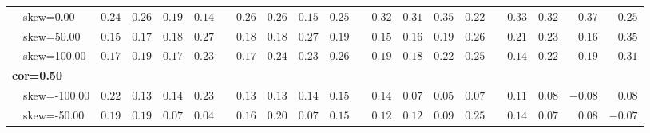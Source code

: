 \begin{table}[!tbp]
\begin{center}
\begin{tabular}{lrrrrcrrrrcrrrrcrrrr}
   ~~skew=0.00&\cellcolor[gray]{0.47}   $0.24$&\cellcolor[gray]{0.47}   $0.26$&\cellcolor[gray]{0.73}   $0.19$&\cellcolor[gray]{0.73}   $0.14$&   &\cellcolor[gray]{0.47}   $0.26$&\cellcolor[gray]{0.47}   $0.26$&\cellcolor[gray]{0.73}   $0.15$&\cellcolor[gray]{0.47}   $0.25$&   &\cellcolor[gray]{0.2}   $0.32$&\cellcolor[gray]{0.47}   $0.31$&\cellcolor[gray]{0.2}   $ 0.35$&\cellcolor[gray]{0.47}   $ 0.22$&   &\cellcolor[gray]{0.2}   $0.33$&\cellcolor[gray]{0.2}   $0.32$&\cellcolor[gray]{0.2}   $ 0.37$&\cellcolor[gray]{0.47}   $ 0.25$\tabularnewline
   ~~skew=50.00&\cellcolor[gray]{0.73}   $0.15$&\cellcolor[gray]{0.73}   $0.17$&\cellcolor[gray]{0.73}   $0.18$&\cellcolor[gray]{0.47}   $0.27$&   &\cellcolor[gray]{0.73}   $0.18$&\cellcolor[gray]{0.73}   $0.18$&\cellcolor[gray]{0.47}   $0.27$&\cellcolor[gray]{0.73}   $0.19$&   &\cellcolor[gray]{0.73}   $0.15$&\cellcolor[gray]{0.73}   $0.16$&\cellcolor[gray]{0.73}   $ 0.19$&\cellcolor[gray]{0.47}   $ 0.26$&   &\cellcolor[gray]{0.47}   $0.21$&\cellcolor[gray]{0.47}   $0.23$&\cellcolor[gray]{0.73}   $ 0.16$&\cellcolor[gray]{0.2}   $ 0.35$\tabularnewline
   ~~skew=100.00&\cellcolor[gray]{0.73}   $0.17$&\cellcolor[gray]{0.73}   $0.19$&\cellcolor[gray]{0.73}   $0.17$&\cellcolor[gray]{0.47}   $0.23$&   &\cellcolor[gray]{0.73}   $0.17$&\cellcolor[gray]{0.47}   $0.24$&\cellcolor[gray]{0.47}   $0.23$&\cellcolor[gray]{0.47}   $0.26$&   &\cellcolor[gray]{0.73}   $0.19$&\cellcolor[gray]{0.73}   $0.18$&\cellcolor[gray]{0.47}   $ 0.22$&\cellcolor[gray]{0.47}   $ 0.25$&   &\cellcolor[gray]{0.73}   $0.14$&\cellcolor[gray]{0.47}   $0.22$&\cellcolor[gray]{0.73}   $ 0.19$&\cellcolor[gray]{0.47}   $ 0.31$\tabularnewline
\hline
{\bfseries cor=0.50}&&&&&&&&&&&&&&&&&&&\tabularnewline
   ~~skew=-100.00&\cellcolor[gray]{0.47}   $0.22$&\cellcolor[gray]{0.73}   $0.13$&\cellcolor[gray]{0.73}   $0.14$&\cellcolor[gray]{0.47}   $0.23$&   &\cellcolor[gray]{0.73}   $0.13$&\cellcolor[gray]{0.73}   $0.13$&\cellcolor[gray]{0.73}   $0.14$&\cellcolor[gray]{0.73}   $0.15$&   &\cellcolor[gray]{0.73}   $0.14$&\cellcolor[gray]{1}   $0.07$&\cellcolor[gray]{1}   $ 0.05$&\cellcolor[gray]{1}   $ 0.07$&   &\cellcolor[gray]{0.73}   $0.11$&\cellcolor[gray]{1}   $0.08$&\cellcolor[gray]{1}   $-0.08$&\cellcolor[gray]{1}   $ 0.08$\tabularnewline
   ~~skew=-50.00&\cellcolor[gray]{0.73}   $0.19$&\cellcolor[gray]{0.73}   $0.19$&\cellcolor[gray]{1}   $0.07$&\cellcolor[gray]{1}   $0.04$&   &\cellcolor[gray]{0.73}   $0.16$&\cellcolor[gray]{0.73}   $0.20$&\cellcolor[gray]{1}   $0.07$&\cellcolor[gray]{0.73}   $0.15$&   &\cellcolor[gray]{0.73}   $0.12$&\cellcolor[gray]{0.73}   $0.12$&\cellcolor[gray]{1}   $ 0.09$&\cellcolor[gray]{0.47}   $ 0.25$&   &\cellcolor[gray]{0.73}   $0.14$&\cellcolor[gray]{1}   $0.07$&\cellcolor[gray]{1}   $ 0.08$&\cellcolor[gray]{1}   $-0.07$\tabularnewline

\end{tabular}
\end{center}
\end{table}
